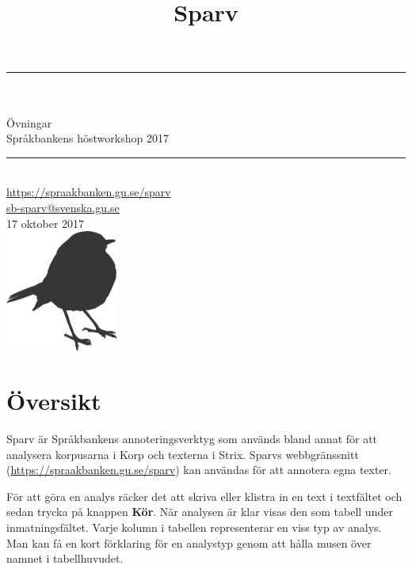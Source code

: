 \documentclass[paper=a4, fontsize=12pt]{scrartcl} %
\title{\huge Sparv}
\numberwithin{equation}{section} %
\numberwithin{figure}{section} %
\numberwithin{table}{section} %
\newcommand{\horrule}[1]{\rule{\linewidth}{#1}} %
\begin{document}
\begin{titlingpage}
\begin{center}
\horrule{0.5pt} \\[0.4cm] %

\thetitle\\
\vspace{5mm}
\normalsize Övningar\\ Språkbankens höstworkshop 2017
\horrule{2pt} \\[0.5cm] %
\vspace{5mm}
\url{https://spraakbanken.gu.se/sparv}\\
\url{sb-sparv@svenska.gu.se}\\
\vspace{5mm}
17 oktober 2017\\
\vspace{4cm}
\includegraphics[height=4cm,keepaspectratio]{sparv.png}

\end{center}
\end{titlingpage}

\newpage


\section*{Översikt}
Sparv är Språkbankens annoteringsverktyg som används bland annat för att
analysera korpusarna i Korp och texterna i Strix. Sparvs webbgränssnitt
(\url{https://spraakbanken.gu.se/sparv}) kan användas för att annotera egna
texter.

För att göra en analys räcker det att skriva eller klistra in en text i
textfältet och sedan trycka på knappen \textbf{Kör}. När analysen är klar %
visas den som tabell under inmatningsfältet. Varje kolumn i tabellen
representerar en viss typ av analys. Man kan få en kort förklaring för
en analystyp genom att hålla musen över namnet i tabellhuvudet.
\end{document}

